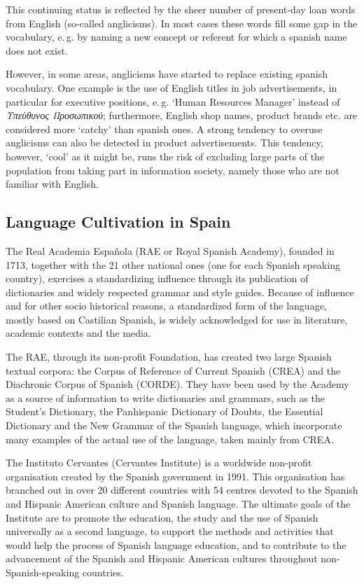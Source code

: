 \begin{multicols}{2}
This continuing status is reflected by the sheer number of present-day loan words from English (so-called anglicisms). In most cases these words fill some gap in the vocabulary, e.\,g. by naming a new concept or referent for which a spanish name does not exist.

However, in some areas, anglicisms have started to replace existing spanish vocabulary. One example is the use of English titles in job advertisements, in particular for executive positions, e.\,g. ‘Human Resources Manager’ instead of \textit{Υπεύθυνος Προσωπικού}; furthermore, English shop names, product brands etc. are considered more ‘catchy’ than spanish ones. A strong tendency to overuse anglicisms can also be detected in product advertisements. This tendency, however, ‘cool’ as it might be, runs the risk of excluding large parts of the population from taking part in information society, namely those who are not familiar with English.

\subsection{Language Cultivation in Spain}

The Real Academia Española (RAE or Royal Spanish Academy), founded in 1713, together with the 21 other national ones (one for each Spanish speaking country), exercises a standardizing influence through its publication of dictionaries and widely respected grammar and style guides. Because of influence and for other socio historical reasons, a standardized form of the language, mostly based on Castilian Spanish, is widely acknowledged for use in literature, academic contexts and the media. 


The RAE, through its non-profit Foundation, has created two large Spanish textual corpora: the  Corpus of Reference of Current Spanish (CREA) and the Diachronic Corpus of Spanish (CORDE). They have been used by the Academy as a source of  information to write dictionaries and grammars, such as the Student's Dictionary, the Panhispanic Dictionary of Doubts, the Essential Dictionary and the New Grammar of the Spanish language, which incorporate many examples of the actual use of the  language, taken mainly from CREA. 

The Instituto Cervantes (Cervantes Institute) is a worldwide non-profit organisation created by the Spanish government in 1991. This organisation has branched out in over 20 different countries with 54 centres devoted to the Spanish and Hispanic American culture and Spanish language. The ultimate goals of the Institute are to promote the education, the study and the use of Spanish universally as a second language, to support the methods and activities that would help the process of Spanish language education, and to contribute to the advancement of the Spanish and Hispanic American cultures throughout non-Spanish-speaking countries.


\end{multicols}
